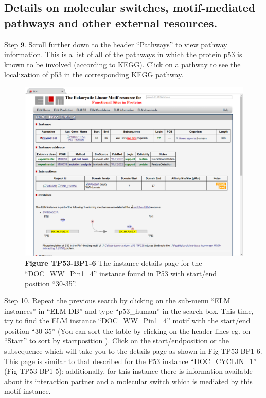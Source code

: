 \subsection{Details on molecular switches, motif-mediated pathways and
other external
resources.}\label{details-on-molecular-switches-motif-mediated-pathways-and-other-external-resources.}

Step 9. Scroll further down to the header ``Pathways'' to view pathway
information. This is a list of all of the pathways in which the protein
p53 is known to be involved (according to KEGG). Click on a pathway to
see the localization of p53 in the corresponding KEGG pathway.

\begin{figure}[h!]
\centering
\includegraphics[width=\textwidth]{Figures/TP53_1/doc_ww_pin_1_4_instance.png}
\caption{
\textbf{Figure TP53-BP1-6} The instance details page for the
``DOC\_WW\_Pin1\_4'' instance found in P53 with start/end position
``30-35''.
}
\end{figure}

Step 10. Repeat the previous search by clicking on the sub-menu ``ELM
instances'' in ``ELM DB'' and type ``p53\_human'' in the search box.
This time, try to find the ELM instance ``DOC\_WW\_Pin1\_4'' motif with
the start/end position ``30-35'' (You can sort the table by clicking on
the header lines eg. on ``Start'' to sort by startposition ). Click on
the start/endposition or the subsequence which will take you to the
details page as shown in Fig TP53-BP1-6. This page is similar to that
described for the P53 instance ``DOC\_CYCLIN\_1'' (Fig TP53-BP1-5);
additionally, for this instance there is information available about its
interaction partner and a molecular switch which is mediated by this
motif instance.

